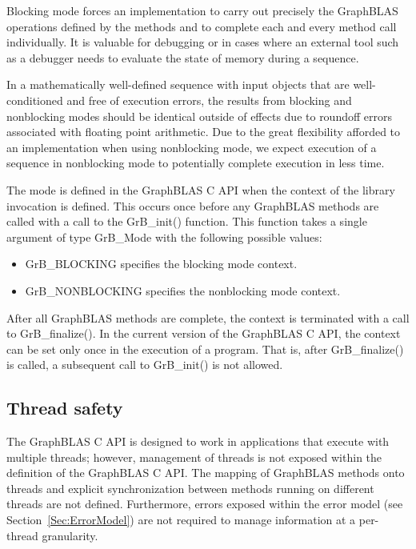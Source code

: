 Blocking mode forces an implementation to carry out precisely the
GraphBLAS operations defined by the methods and to complete each and
every method call individually.  It is valuable for debugging or in
cases where an external tool such as a debugger needs to evaluate the
state of memory during a sequence.

In a  mathematically well-defined sequence with input objects that
are well-conditioned and free of execution errors, the results from
blocking and nonblocking modes should be identical outside of effects
due to roundoff errors associated with floating point arithmetic.
Due to the great flexibility afforded to an implementation when using
nonblocking mode, we expect execution of a sequence in nonblocking mode
to potentially complete execution in less time.

The mode is defined in the GraphBLAS C API when the context of the
library invocation is defined.  This occurs once before any GraphBLAS
methods are called with a call to the {\sf GrB\_init()} function.  This function
takes a single argument of type {\sf GrB\_Mode} with the following possible values:
\begin{itemize}
\item {\sf GrB\_BLOCKING} specifies the blocking mode context.
\item {\sf GrB\_NONBLOCKING} specifies the nonblocking mode context.
\end{itemize}
After all GraphBLAS methods are complete, the context is terminated
with a call to {\sf GrB\_finalize()}.  In the current version of the
GraphBLAS C API, the context can be set only once in the execution of
a program. That is, after {\sf GrB\_finalize()} is called, a subsequent
call to {\sf GrB\_init()} is not allowed.


\subsection{Thread safety}
\label{Sec:ThreadSafety}

The GraphBLAS C API is designed to work in applications that execute with multiple threads; however, 
management of threads is not exposed within the definition of the GraphBLAS C API.   The mapping of 
GraphBLAS methods onto threads and explicit synchronization between methods running on different threads 
are not defined.  Furthermore, errors exposed within the error model (see Section~\ref{Sec:ErrorModel}) are
not required to manage information at a per-thread granularity.

